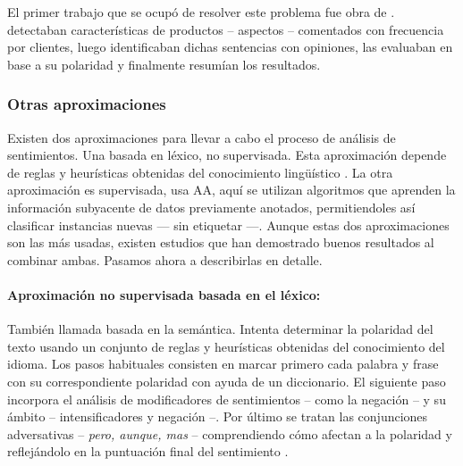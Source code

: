 El primer trabajo que se ocupó de resolver este problema fue obra de
\citet{Hu2004}. \citeauthor{Hu2004} detectaban características de productos --
aspectos -- comentados con frecuencia por clientes, luego identificaban dichas
sentencias con opiniones, las evaluaban en base a su polaridad y finalmente
resumían los resultados.

\subsubsection{Otras aproximaciones}
\label{sec:approaches}

Existen dos aproximaciones para llevar a cabo el proceso de análisis de
sentimientos. Una basada en léxico, no supervisada. Esta aproximación depende
de reglas y heurísticas obtenidas del conocimiento lingüístico
\cite{VILARES2013}. La otra aproximación es supervisada, usa \ac{AA}, aquí se
utilizan algoritmos que aprenden la información subyacente de datos previamente
anotados, permitiendoles así clasificar instancias nuevas --- sin etiquetar
\cite{Pang:2002:TUS:1118693.1118704} ---. Aunque estas dos aproximaciones son las más usadas, existen
estudios que han demostrado buenos resultados al combinar ambas. Pasamos ahora a
describirlas en detalle.

\paragraph{Aproximación no supervisada basada en el léxico:} También llamada
basada en la semántica. Intenta determinar la polaridad del texto usando un
conjunto de reglas y heurísticas obtenidas del conocimiento del idioma. Los
pasos habituales consisten en marcar primero cada palabra y frase con su
correspondiente polaridad con ayuda de un diccionario. El siguiente paso
incorpora el análisis de modificadores de sentimientos -- como la negación -- y
su ámbito -- intensificadores y negación --. Por último se tratan las
conjunciones adversativas -- \emph{pero, aunque, mas} -- comprendiendo cómo
afectan a la polaridad y reflejándolo en la puntuación final del sentimiento
\cite{Liu2012}.


